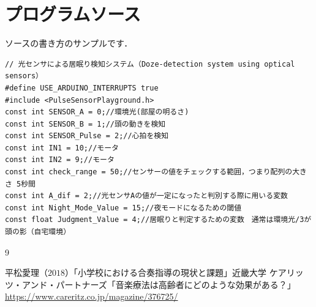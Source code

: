 \documentclass[uplatex,dvipdfmx]{jlreq}
\begin{document}
\section{プログラムソース}

ソースの書き方のサンプルです．

\begin{lstlisting}
// 光センサによる居眠り検知システム（Doze-detection system using optical sensors）
#define USE_ARDUINO_INTERRUPTS true  
#include <PulseSensorPlayground.h>  
const int SENSOR_A = 0;//環境光(部屋の明るさ)
const int SENSOR_B = 1;//頭の動きを検知
const int SENSOR_Pulse = 2;//心拍を検知
const int IN1 = 10;//モータ
const int IN2 = 9;//モータ
const int check_range = 50;//センサーの値をチェックする範囲，つまり配列の大きさ 5秒間
const int A_dif = 2;//光センサAの値が一定になったと判別する際に用いる変数
const int Night_Mode_Value = 15;//夜モードになるための閾値
const float Judgment_Value = 4;//居眠りと判定するための変数　通常は環境光/3が頭の影（自宅環境）
\end{lstlisting}

\begin{thebibliography}{9}

平松愛理（$2018$）「小学校における合奏指導の現状と課題」近畿大学
 ケアリッツ・アンド・パートナーズ「音楽療法は高齢者にどのような効果がある？」\\
\url{https://www.careritz.co.jp/magazine/376725/}

\end{thebibliography}
\end{document}
